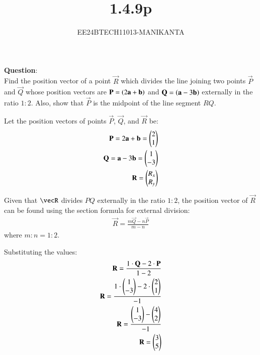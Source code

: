 \documentclass[journal]{IEEEtran}
\begin{document}

\vspace{3cm}

\title{1.4.9p}
\author{EE24BTECH11013-MANIKANTA}
\maketitle
{\let\newpage\relax\maketitle}

\renewcommand{\thefigure}{\theenumi}
\renewcommand{\thetable}{\theenumi}
\setlength{\intextsep}{10pt} %

\renewcommand{\thetable}{\theenumi}

\textbf{Question}:\\
Find the position vector of a point $\vec R$ which divides the line joining two points $\vec P$ and $\vec Q$ whose position vectors are $\mathbf{P} = \left(2\mathbf{a} + \mathbf{b}\right)$ and $\mathbf{Q} = \left(\mathbf{a} - 3\mathbf{b}\right)$ externally in the ratio $1:2$. Also, show that $\vec P$ is the midpoint of the line segment $RQ$.\\

\solution

Let the position vectors of points $\vec P$, $\vec Q$, and $\vec R$ be:
\begin{align}
\mathbf{P} = 2\mathbf{a} + \mathbf{b} = \begin{pmatrix}2\\1\end{pmatrix} \\
\mathbf{Q} = \mathbf{a} - 3\mathbf{b} = \begin{pmatrix}1\\-3\end{pmatrix} \\
\mathbf{R} = \begin{pmatrix}R_x\\R_y\end{pmatrix}
\end{align}

Given that $\vecR$ divides $PQ$ externally in the ratio $1:2$, the position vector of $\vec R$ can be found using the section formula for external division:
\begin{align}
\vec{R} = \frac{m\vec{Q} - n\vec{P}}{m - n}
\end{align}
where $m:n = 1:2$.

Substituting the values:
\begin{align}
\mathbf{R} = \frac{1 \cdot \mathbf{Q} - 2 \cdot \mathbf{P}}{1 - 2} \\
\mathbf{R} = \frac{1 \cdot \begin{pmatrix}1\\-3\end{pmatrix} - 2 \cdot \begin{pmatrix}2\\1\end{pmatrix}}{ -1} \\
\mathbf{R} = \frac{\begin{pmatrix}1\\-3\end{pmatrix} - \begin{pmatrix}4\\2\end{pmatrix}}{-1} \\
\mathbf{R}= \begin{pmatrix}3\\5\end{pmatrix}
\end{align}
\end{document}
